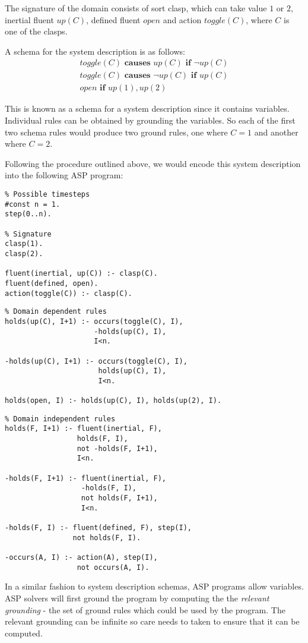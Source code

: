 \documentclass[../interim.tex]{subfiles}
\begin{document}
The signature of the domain consists of sort clasp, which can take value $1$ or $2$, inertial fluent $up(C)$, defined fluent $open$ and action $toggle(C)$, where $C$ is one of the clasps.

A schema for the system description is as follows:
\begin{gather}
  toggle(C) \textbf{  causes  } up(C) \textbf{  if  } \neg up(C) \\
  toggle(C) \textbf{  causes  } \neg up(C) \textbf{  if  } up(C) \\
  open \textbf{  if  } up(1), up(2)
\end{gather}

This is known as a schema for a system description since it contains variables. Individual rules can be obtained by grounding the variables. So each of the first two schema rules would produce two ground rules, one where $C=1$ and another where $C=2$.

Following the procedure outlined above, we would encode this system description into the following ASP program:
\begin{verbatim}
% Possible timesteps
#const n = 1.
step(0..n).

% Signature
clasp(1).
clasp(2).

fluent(inertial, up(C)) :- clasp(C).
fluent(defined, open).
action(toggle(C)) :- clasp(C).
\end{verbatim}

\begin{verbatim}
% Domain dependent rules
holds(up(C), I+1) :- occurs(toggle(C), I),
                     -holds(up(C), I),
                     I<n.

-holds(up(C), I+1) :- occurs(toggle(C), I),
                      holds(up(C), I),
                      I<n.

holds(open, I) :- holds(up(C), I), holds(up(2), I).
\end{verbatim}

\begin{verbatim}
% Domain independent rules
holds(F, I+1) :- fluent(inertial, F),
                 holds(F, I),
                 not -holds(F, I+1),
                 I<n.

-holds(F, I+1) :- fluent(inertial, F),
                  -holds(F, I),
                  not holds(F, I+1),
                  I<n.

-holds(F, I) :- fluent(defined, F), step(I),
                not holds(F, I).

-occurs(A, I) :- action(A), step(I),
                 not occurs(A, I).
\end{verbatim}

In a similar fashion to system description schemas, ASP programs allow variables. ASP solvers will first ground the program by computing the the \textit{relevant grounding} - the set of ground rules which could be used by the program. The relevant grounding can be infinite so care needs to taken to ensure that it can be computed.
\end{document}
